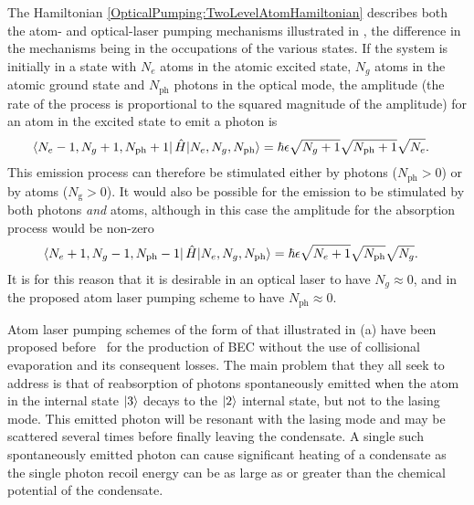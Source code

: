 The Hamiltonian \eqref{OpticalPumping:TwoLevelAtomHamiltonian} describes both the atom- and optical-laser pumping mechanisms illustrated in , the difference in the mechanisms being in the occupations of the various states.  If the system is initially in a state with $N_e$ atoms in the atomic excited state, $N_g$ atoms in the atomic ground state and $N_\text{ph}$ photons in the optical mode, the amplitude (the rate of the process is proportional to the squared magnitude of the amplitude) for an atom in the excited state to emit a photon is
\begin{align}
    \left<N_e-1, N_g + 1, N_\text{ph} + 1\right| \hat{H} {\left|N_e, N_g, N_\text{ph}\right>} &= \hbar \epsilon \sqrt{N_g+1} \sqrt{N_\text{ph}+1} \sqrt{N_e}.
\end{align}
This emission process can therefore be stimulated either by photons ($N_\text{ph} > 0$) or by atoms ($N_\text{g} > 0$).  It would also be possible for the emission to be stimulated by both photons \emph{and} atoms, although in this case the amplitude for the absorption process would be non-zero
\begin{align}
    \left<N_e+1, N_g - 1, N_\text{ph} - 1\right| \hat{H} {\left|N_e, N_g, N_\text{ph}\right>} &= \hbar \epsilon \sqrt{N_e+1} \sqrt{N_\text{ph}} \sqrt{N_g}.
\end{align}
It is for this reason that it is desirable in an optical laser to have $N_g \approx 0$, and in the proposed atom laser pumping scheme to have $N_\text{ph} \approx 0$.

Atom laser pumping schemes of the form of that illustrated in (a) have been proposed before~\citep{Olshanii:1996,Janicke:1996,Spreeuw:1995,Cirac:1996rr,Cirac:1996,Santos:2000,Castin:1998,Cirac:1994,Vengalattore:2003,Santos:2001ve,Wolf:2000,Santos:1999qf} for the production of BEC without the use of collisional evaporation and its consequent losses.  The main problem that they all seek to address is that of reabsorption of photons spontaneously emitted when the atom in the internal state ${\left|3\right>}$ decays to the ${\left|2\right>}$ internal state, but not to the lasing mode.  This emitted photon will be resonant with the lasing mode and may be scattered several times before finally leaving the condensate.  A single such spontaneously emitted photon can cause significant heating of a condensate as the single photon recoil energy can be as large as or greater than the chemical potential of the condensate.

